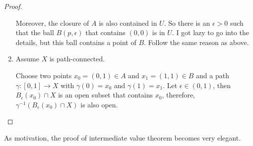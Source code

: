 \begin{proof}
\begin{enumerate}
        Moreover, the closure of \(A\) is also contained in \(U\). So there is an \(\epsilon > 0\) such that the ball \(B(p, \epsilon)\) that contains \((0, 0)\) is in \(U\). I got lazy to go into the details, but this ball contains a point of \(B\). Follow the same reason as above.
        \item Assume \(X\) is path-connected. 
        
        
        
        Choose two points \(x_0 = (0, 1) \in A\) and \(x_1 = (1, 1) \in B\) and a path \(\gamma: [0, 1] \longrightarrow X\) with \(\gamma(0) = x_0\) and \(\gamma(1) = x_1\). Let \(\epsilon \in (0, 1)\), then \(B_\epsilon(x_0) \cap X\) is an open subset that contains \(x_0\), therefore, \(\gamma^{-1}(B_\epsilon(x_0) \cap X)\) is also open.
    \end{enumerate}
\end{proof}

As motivation, the proof of intermediate value theorem becomes very elegant.